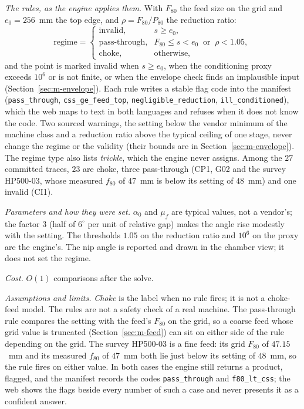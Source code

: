 \emph{The rules, as the engine applies them.} With $F_{80}$ the feed size on the grid and $e_0=256$~mm the top edge, and $\rho=F_{80}/P_{80}$
the reduction ratio:
\begin{equation}
\text{regime} = \begin{cases}
\text{invalid}, & s \ge e_0,\\
\text{pass-through}, & F_{80}\le s < e_0 \ \text{ or }\ \rho < 1.05,\\
\text{choke}, & \text{otherwise},
\end{cases}
\label{eq:regime}
\end{equation}
and the point is marked invalid when $s\ge e_0$, when the conditioning proxy exceeds $10^{6}$ or is not finite, or when the envelope
check finds an implausible input (Section~\ref{sec:m-envelope}). Each rule writes a stable flag code into the manifest
(\texttt{pass\_through}, \texttt{css\_ge\_feed\_top}, \texttt{negligible\_reduction}, \texttt{ill\_conditioned}), which the web maps to
text in both languages and refuses when it does not know the code. Two sourced warnings, the setting below the vendor minimum of the
machine class and a reduction ratio above the typical ceiling of one stage, never change the regime or the validity (their bounds are in
Section~\ref{sec:m-envelope}). The regime type also lists \emph{trickle}, which the engine never assigns. Among the $27$ committed traces,
$23$ are choke, three pass-through (CP1, G02 and the survey HP500-03, whose measured $f_{80}$ of $47$~mm is below its setting of
$48$~mm) and one invalid (CI1).

\emph{Parameters and how they were set.} $\alpha_0$ and $\mu_f$ are typical values, not a vendor's; the factor $3$ (half of $6^\circ$
per unit of relative gap) makes the angle rise modestly with the setting. The thresholds $1.05$ on the reduction ratio and $10^{6}$ on
the proxy are the engine's. The nip angle is reported and drawn in the chamber view; it does not set the regime.

\emph{Cost.} $O(1)$ comparisons after the solve.

\emph{Assumptions and limits.} \emph{Choke} is the label when no rule fires; it is not a choke-feed model. The rules are not a safety
check of a real machine. The pass-through rule compares the setting with the feed's $F_{80}$ on the grid, so a coarse feed whose grid value
is truncated (Section~\ref{sec:m-feed}) can sit on either side of the rule depending on the grid. The survey HP500-03 is a fine feed:
its grid $F_{80}$ of $47.15$~mm and its measured $f_{80}$ of $47$~mm both lie just below its setting of $48$~mm, so the rule fires on
either value.
In both cases the engine still returns a product, flagged, and the manifest records the codes \texttt{pass\_through} and \texttt{f80\_lt\_css};
the web shows the flags beside every number of such a case and never presents it as a confident answer.

